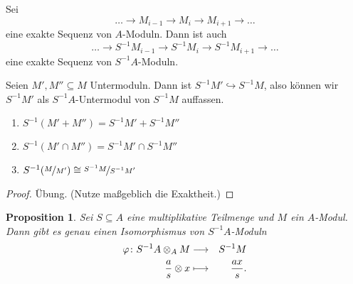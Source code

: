 \documentclass[12pt,a4paper]{scrartcl}
\theoremstyle{cplain}
\newtheorem{prop}[thmcounter]{Proposition}
\theoremstyle{cdef}
\begin{document}
\begin{kor} \label{kor:lokalisation erhaelt exaktheit}
	Sei \[\ldots\to M_{i-1}\to M_i\to M_{i+1}\to\ldots\] eine exakte Sequenz von $A$-Moduln. Dann ist auch 
	\[\ldots \to S^{-1}M_{i-1}\to S^{-1}M_i\to S^{-1}M_{i+1}\to \ldots\]
	eine exakte Sequenz von $S^{-1}A$-Moduln.
\end{kor}
\begin{kor}
	Seien $M',M''\subseteq M$ Untermoduln. Dann ist $S^{-1}M'\hookrightarrow S^{-1}M$, also können wir $S^{-1}M'$ als $S^{-1}A$-Untermodul von $S^{-1}M$ auffassen.
	\begin{enumerate}
		\item $S^{-1}(M'+M'') = S^{-1}M'+S^{-1}M''$
		\item $S^{-1}(M'\cap M'') = S^{-1}M'\cap S^{-1}M''$
		\item $S^{-1}(\nicefrac{M}{M'}) \cong \nicefrac{S^{-1}M}{S^{-1}M'}$
	\end{enumerate}
\end{kor}
\begin{proof} Übung. (Nutze maßgeblich die Exaktheit.)
\end{proof}
\begin{prop} \label{prop:5.8}
	Sei $S\subseteq A$ eine multiplikative Teilmenge und $M$ ein $A$-Modul. Dann gibt es genau einen Isomorphismus von $S^{-1}A$-Moduln
	\begin{eqnarray*}
		\varphi\colon S^{-1}A\otimes_AM &\longrightarrow& S^{-1}M \\
		\frac as \otimes x &\longmapsto& \frac{ax}s.
	\end{eqnarray*}
\end{prop}
\end{document}
